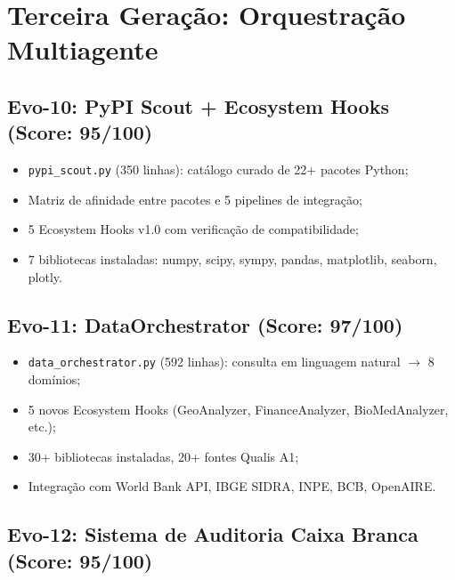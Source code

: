 \documentclass[12pt,a4paper,sumario=tradicional]{abntex2}
\begin{document}
\chapter{Terceira Geração: Orquestração Multiagente}

\section{Evo-10: PyPI Scout + Ecosystem Hooks (Score: 95/100)}

\begin{itemize}
    \item \texttt{pypi\_scout.py} (350 linhas): catálogo curado de 22+ pacotes Python;
    \item Matriz de afinidade entre pacotes e 5 pipelines de integração;
    \item 5 Ecosystem Hooks v1.0 com verificação de compatibilidade;
    \item 7 bibliotecas instaladas: numpy, scipy, sympy, pandas, matplotlib, seaborn, plotly.
\end{itemize}

\section{Evo-11: DataOrchestrator (Score: 97/100)}

\begin{itemize}
    \item \texttt{data\_orchestrator.py} (592 linhas): consulta em linguagem natural $\to$ 8 domínios;
    \item 5 novos Ecosystem Hooks (GeoAnalyzer, FinanceAnalyzer, BioMedAnalyzer, etc.);
    \item 30+ bibliotecas instaladas, 20+ fontes Qualis A1;
    \item Integração com World Bank API, IBGE SIDRA, INPE, BCB, OpenAIRE.
\end{itemize}

\section{Evo-12: Sistema de Auditoria Caixa Branca (Score: 95/100)}
\end{document}
